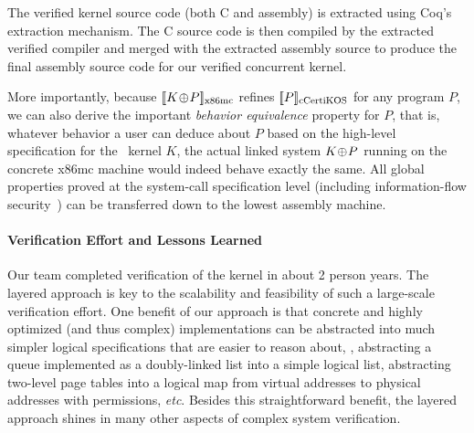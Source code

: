The verified kernel source code (both C and assembly) is extracted using 
Coq's extraction mechanism. The C source code is then compiled by the
extracted verified compiler and merged with the extracted assembly source to
produce the final assembly source code for our verified concurrent kernel. 


More importantly, because $\sem{\rm{}x86mc}{K\join{}P}$ refines
$\sem{\rm\cCTOS}{P}$ for any program $P$, we can also derive the
important {\em behavior equivalence} property for $P$, that is,
whatever behavior a user can deduce about $P$ based on the high-level
specification for the \cCTOS\ kernel $K$, the actual linked
system $K\join{}P$ running on the concrete x86mc machine would indeed
behave exactly the same.  All global properties proved at the
system-call specification level (including information-flow
security~\cite{costanzo16}) can be transferred down to the lowest
assembly machine.









\paragraph{Verification Effort and Lessons Learned}
Our team completed verification of the \cCTOS{} kernel in about 2 person years.
The layered approach is key to the scalability and feasibility of such a
large-scale verification effort.
One benefit of our approach is that
concrete and highly optimized (and thus complex) implementations can be abstracted
into much simpler logical specifications that are easier to reason about,
\eg, abstracting a queue implemented as a doubly-linked list into a simple logical list,
abstracting two-level page tables into a logical map from virtual addresses
to physical addresses with permissions, {\it etc}.
Besides this straightforward benefit, the layered approach shines in many other
aspects of complex system verification.

